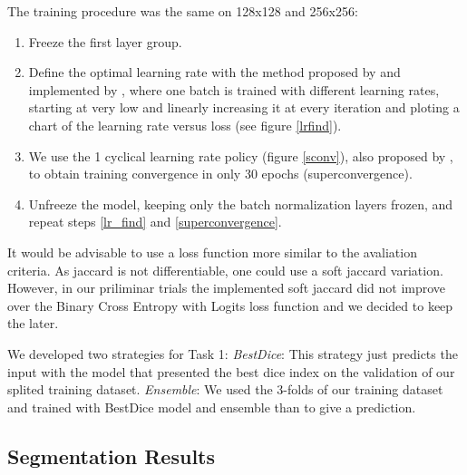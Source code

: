 The training procedure was the same on 128x128 and 256x256:
\begin{enumerate}
  \item Freeze the first layer group.
  \item \label{lr_find}Define the optimal learning rate with the method proposed by \cite{leslie} and implemented by \cite{fastai}, where one batch is trained with different learning rates, starting at very low and linearly increasing it at every iteration and ploting a chart of the learning rate versus loss (see figure \ref{lrfind}).
  \item \label{superconvergence}We use the 1 cyclical learning rate policy (figure \ref{sconv}), also proposed by \cite{leslie}, to obtain training convergence in only 30 epochs (superconvergence).
  \item Unfreeze the model, keeping only the batch normalization layers frozen, and repeat steps \ref{lr_find} and \ref{superconvergence}.
\end{enumerate}

It would be advisable to use a loss function more similar to the avaliation criteria. As jaccard is not differentiable, one could use a soft jaccard variation\cite{iglovikov}. However, in our priliminar trials the implemented soft jaccard did not improve over the Binary Cross Entropy with Logits loss function and we decided to keep the later. 

We developed two strategies for Task 1:
\emph{BestDice}: This strategy just predicts the input with the model that presented the best dice index on the validation of our splited training dataset. 
\emph{Ensemble}: We used the 3-folds of our training dataset and trained with BestDice model and ensemble than to give a prediction. 

\subsection{Segmentation Results}

